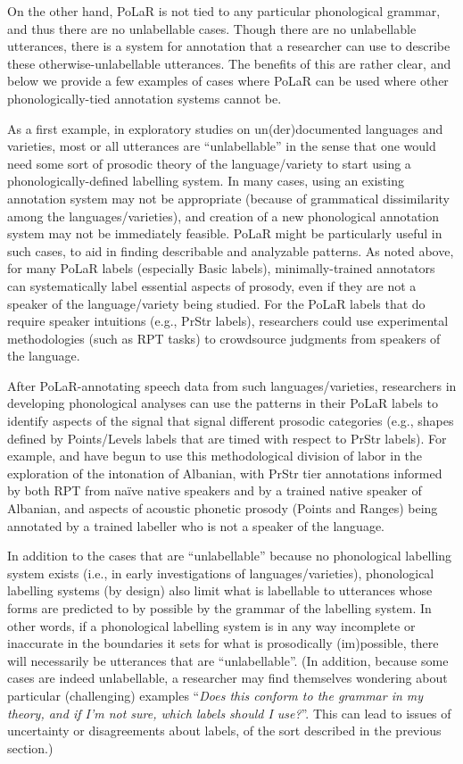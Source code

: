 On the other hand, PoLaR is not tied to any particular phonological grammar, and thus there are no unlabellable cases. Though there are no unlabellable utterances, there is a system for annotation that a researcher can use to describe these otherwise-unlabellable utterances. The benefits of this are rather clear, and below we provide a few examples of cases where PoLaR can be used where other phonologically-tied annotation systems cannot be.

As a first example, in exploratory studies on un(der)documented languages and varieties, most or all utterances are “unlabellable” in the sense that one would need some sort of prosodic theory of the language\slash variety to start using a phonologically-defined labelling system. In many cases, using an existing annotation system may not be appropriate (because of grammatical dissimilarity among the languages\slash varieties), and creation of a new phonological annotation system may not be immediately feasible. PoLaR might be particularly useful in such cases, to aid in finding describable and analyzable patterns. As noted above, for many PoLaR labels (especially Basic labels), minimally-trained annotators can systematically label essential aspects of prosody, even if they are not a speaker of the language\slash variety being studied. For the PoLaR labels that do require speaker intuitions (e.g., PrStr labels), researchers could use experimental methodologies (such as RPT tasks) to crowdsource judgments from speakers of the language.

After PoLaR-annotating speech data from such languages\slash varieties, researchers in developing phonological analyses can use the patterns in their PoLaR labels to identify aspects of the signal that signal different prosodic categories (e.g., shapes defined by Points\slash Levels labels that are timed with respect to PrStr labels). For example, \citet{kapia-19} and \citet{brugos-21} have begun to use this methodological division of labor in the exploration of the intonation of Albanian, with PrStr tier annotations informed by both RPT from naïve native speakers and by a trained native speaker of Albanian, and aspects of acoustic phonetic prosody (Points and Ranges) being annotated by a trained labeller who is not a speaker of the language.

In addition to the cases that are “unlabellable” because no phonological labelling system exists (i.e., in early investigations of languages\slash varieties), phonological labelling systems (by design) also limit what is labellable to utterances whose forms are predicted to by possible by the grammar of the labelling system. In other words, if a phonological labelling system is in any way incomplete or inaccurate in the boundaries it sets for what is prosodically (im)possible, there will necessarily be utterances that are “unlabellable”. (In addition, because some cases are indeed unlabellable, a researcher may find themselves wondering about particular (challenging) examples “\textit{Does this conform to the grammar in my theory, and if I’m not sure, which labels should I use?}”. This can lead to issues of uncertainty or disagreements about labels, of the sort described in the previous section.)

